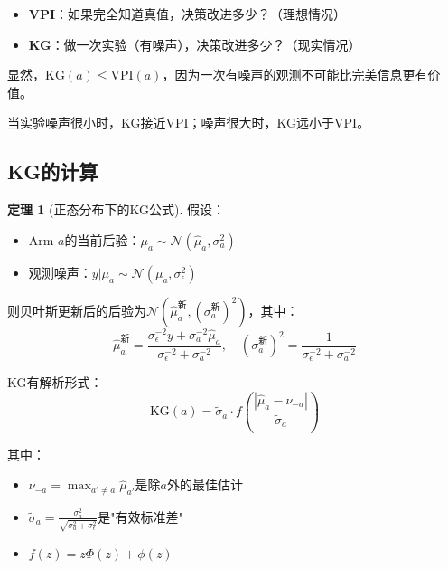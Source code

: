 \documentclass[11pt,a4paper]{article}
\theoremstyle{definition}
\newtheorem{theorem}{定理}[section]
\begin{document}
\begin{plainwords}[KG vs VPI]
\begin{itemize}
    \item \textbf{VPI}：如果完全知道真值，决策改进多少？（理想情况）
    \item \textbf{KG}：做一次实验（有噪声），决策改进多少？（现实情况）
\end{itemize}

显然，$\text{KG}(a) \leq \text{VPI}(a)$，因为一次有噪声的观测不可能比完美信息更有价值。

当实验噪声很小时，KG接近VPI；噪声很大时，KG远小于VPI。
\end{plainwords}

\subsection{KG的计算}

\begin{theorem}[正态分布下的KG公式]
假设：
\begin{itemize}
    \item Arm $a$的当前后验：$\mu_a \sim \mathcal{N}(\hat{\mu}_a, \sigma_a^2)$
    \item 观测噪声：$y | \mu_a \sim \mathcal{N}(\mu_a, \sigma_\epsilon^2)$
\end{itemize}

则贝叶斯更新后的后验为$\mathcal{N}(\hat{\mu}_a^{\text{新}}, (\sigma_a^{\text{新}})^2)$，其中：
\[
\hat{\mu}_a^{\text{新}} = \frac{\sigma_\epsilon^{-2} y + \sigma_a^{-2} \hat{\mu}_a}{\sigma_\epsilon^{-2} + \sigma_a^{-2}}, \quad (\sigma_a^{\text{新}})^2 = \frac{1}{\sigma_\epsilon^{-2} + \sigma_a^{-2}}
\]

KG有解析形式：
\[
\text{KG}(a) = \tilde{\sigma}_a \cdot f\left(\frac{|\hat{\mu}_a - \nu_{-a}|}{\tilde{\sigma}_a}\right)
\]

其中：
\begin{itemize}
    \item $\nu_{-a} = \max_{a' \neq a} \hat{\mu}_{a'}$是除$a$外的最佳估计
    \item $\tilde{\sigma}_a = \frac{\sigma_a^2}{\sqrt{\sigma_a^2 + \sigma_\epsilon^2}}$是"有效标准差"
    \item $f(z) = z\Phi(z) + \phi(z)$
\end{itemize}
\end{theorem}
\end{document}
